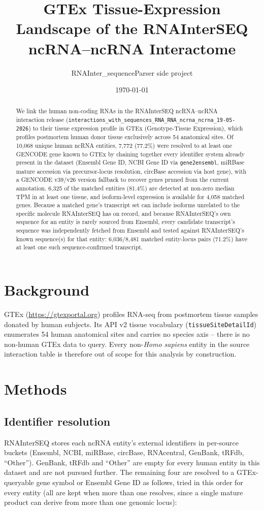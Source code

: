 \documentclass[11pt]{article}
\title{GTEx Tissue-Expression Landscape of the RNAInterSEQ ncRNA--ncRNA Interactome}
\author{RNAInter\_sequenceParser side project}
\date{\today}
\begin{document}
\maketitle

\begin{abstract}
We link the human non-coding RNAs in the RNAInterSEQ ncRNA--ncRNA interaction
release (\texttt{interactions\_with\_sequences\_RNA\_RNA\_ncrna\_ncrna\_19-05-2026})
to their tissue expression profile in GTEx (Genotype-Tissue Expression),
which profiles postmortem human donor tissue exclusively across
54 anatomical sites. Of 10,068 unique human ncRNA entities,
7,772 (77.2\%) were resolved to at least one GENCODE gene known
to GTEx by chaining together every identifier system already present in the
dataset (Ensembl Gene ID, NCBI Gene ID via \texttt{gene2ensembl}, miRBase
mature accession via precursor-locus resolution, circBase accession via host
gene), with a GENCODE v39/v26 version fallback to recover genes pruned from
the current annotation. 6,325 of the matched entities (81.4\%)
are detected at non-zero median TPM in at least one tissue, and isoform-level
expression is available for 4,058 matched genes. Because a matched
gene's transcript set can include isoforms unrelated to the specific
molecule RNAInterSEQ has on record, and because RNAInterSEQ's own sequence
for an entity is rarely sourced from Ensembl, every candidate transcript's
sequence was independently fetched from Ensembl and tested against
RNAInterSEQ's known sequence(s) for that entity: 6,036/8,481
matched entity-locus pairs (71.2\%) have at least one such
sequence-confirmed transcript.
\end{abstract}

\section{Background}
GTEx (\url{https://gtexportal.org}) profiles RNA-seq from postmortem tissue
samples donated by human subjects. Its API v2 tissue vocabulary
(\texttt{tissueSiteDetailId}) enumerates 54 human anatomical sites
and carries no species axis -- there is no non-human GTEx data to query.
Every non-\emph{Homo sapiens} entity in the source interaction table is
therefore out of scope for this analysis by construction.

\section{Methods}

\subsection{Identifier resolution}
RNAInterSEQ stores each ncRNA entity's external identifiers in per-source
buckets (Ensembl, NCBI, miRBase, circBase, RNAcentral, GenBank, tRFdb,
``Other''). GenBank, tRFdb and ``Other'' are empty for every human entity in
this dataset and are not pursued further. The remaining four are resolved to
a GTEx-queryable gene symbol or Ensembl Gene ID as follows, tried in this
order for every entity (all are kept when more than one resolves, since a
single mature product can derive from more than one genomic locus):
\end{document}
